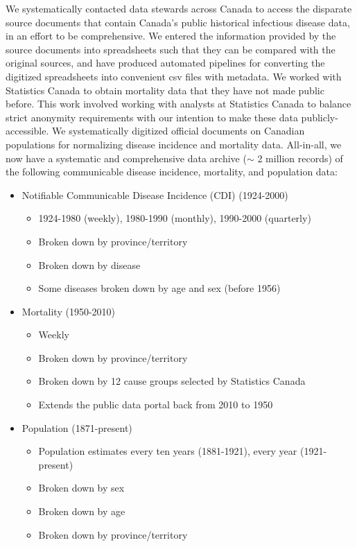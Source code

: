 We systematically contacted data stewards across Canada to access the disparate source documents that contain Canada's public historical infectious disease data, in an effort to be comprehensive. We entered the information provided by the source documents into spreadsheets such that they can be compared with the original sources, and have produced automated pipelines for converting the digitized spreadsheets into convenient csv files with metadata. We worked with Statistics Canada to obtain mortality data that they have not made public before. This work involved working with analysts at Statistics Canada to balance strict anonymity requirements with our intention to make these data publicly-accessible. We systematically digitized official documents on Canadian populations for normalizing disease incidence and mortality data. All-in-all, we now have a systematic and comprehensive data archive ($\sim$ 2 million records) of the following communicable disease incidence, mortality, and population data:
\begin{itemize}
  \item Notifiable Communicable Disease Incidence (CDI) (1924-2000)
    \begin{itemize}
      \item 1924-1980 (weekly), 1980-1990 (monthly), 1990-2000 (quarterly)
      \item Broken down by province/territory
      \item Broken down by disease
      \item Some diseases broken down by age and sex (before 1956)
    \end{itemize}
  \item Mortality (1950-2010)
    \begin{itemize}
      \item Weekly
      \item Broken down by province/territory
      \item Broken down by 12 cause groups selected by Statistics Canada
      \item Extends the public data portal back from 2010 to 1950
    \end{itemize}
  \item Population (1871-present)
    \begin{itemize}
      \item Population estimates every ten years (1881-1921), every year (1921-present)
      \item Broken down by sex
      \item Broken down by age
      \item Broken down by province/territory
    \end{itemize}
\end{itemize}

